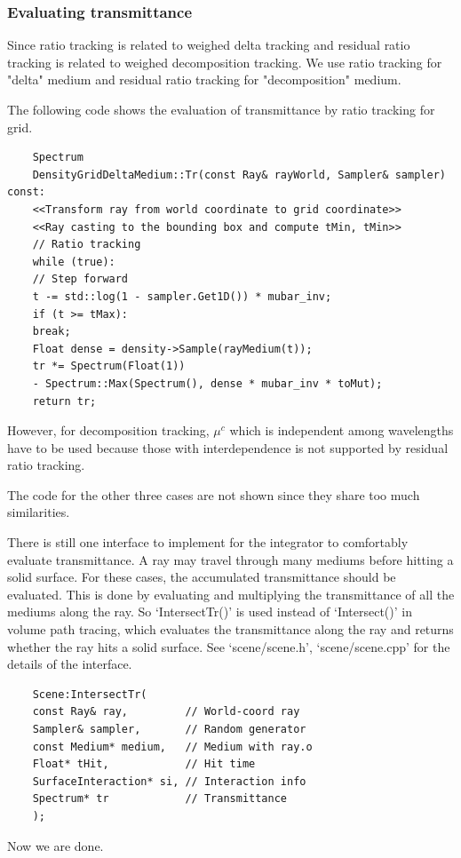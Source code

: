 \documentclass[acmtog]{acmart}
\begin{document}
\subsubsection{Evaluating transmittance}
Since ratio tracking is related to weighed delta tracking and residual ratio tracking is related to weighed decomposition tracking.
We use ratio tracking for "delta" medium and residual ratio tracking for "decomposition" medium.\par
The following code shows the evaluation of transmittance by ratio tracking for grid.
\lstset{basicstyle=\tiny\ttfamily}
\begin{lstlisting}
	Spectrum
	DensityGridDeltaMedium::Tr(const Ray& rayWorld, Sampler& sampler) const:
	<<Transform ray from world coordinate to grid coordinate>>
	<<Ray casting to the bounding box and compute tMin, tMin>>
	// Ratio tracking
	while (true):
	// Step forward
	t -= std::log(1 - sampler.Get1D()) * mubar_inv;
	if (t >= tMax):
	break;
	Float dense = density->Sample(rayMedium(t));
	tr *= Spectrum(Float(1)) 
	- Spectrum::Max(Spectrum(), dense * mubar_inv * toMut);
	return tr;
\end{lstlisting}
\lstset{basicstyle=\small\ttfamily}
However, for decomposition tracking, $\mu^c$ which is independent among wavelengths have to be used
because those with interdependence is not supported by residual ratio tracking.\par
The code for the other three cases are not shown since they share too much similarities.\par
There is still one interface to implement for the integrator to comfortably evaluate transmittance.
A ray may travel through many mediums before hitting a solid surface.
For these cases, the accumulated transmittance should be evaluated.
This is done by evaluating and multiplying the transmittance of all the mediums along the ray.
So `IntersectTr()' is used instead of `Intersect()' in volume path tracing, 
which evaluates the transmittance along the ray and returns whether the ray hits a solid surface.
See `scene/scene.h', `scene/scene.cpp' for the details of the interface.
\begin{lstlisting}
	Scene:IntersectTr(
	const Ray& ray,         // World-coord ray
	Sampler& sampler,       // Random generator
	const Medium* medium,   // Medium with ray.o
	Float* tHit,            // Hit time
	SurfaceInteraction* si, // Interaction info
	Spectrum* tr            // Transmittance
	);
\end{lstlisting}
Now we are done.
\end{document}
